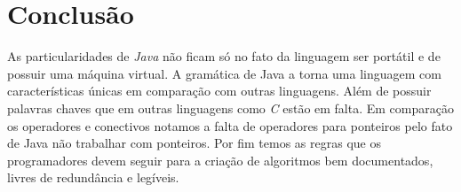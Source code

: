 \documentclass[conference]{IEEEtran}
\begin{document}
\begin{comment}
4.	Nomeação
a.	Use nomes significantes para variáveis, métodos e classes
b.	Para variáveis, métodos e pacotes devem ser usados palavras com caixa baixa. Nomes de classes devem conter palavras com a primeira letra maiúscula. Se um nome contém mais que duas palavras, é ideal deixar as palavras extras com letra maíscula.
c.	Use “final static” para declarar constantes nomeadas para representar dados constantes. Constantes geralmente tem nomes que estão de forma integral em caixa alta e com as palavras separadas com o traço inferior.
5.	Métodos
a.	Métodos devem conter uma clara e única tarefa identificável.
b.	Uma definição de método individual não deve ser muito longa. Em geral uma função não deve ser maior que uma página impressa.
c.	Os métodos de instância podem acessar as variáveis de instâncias que representam o estado de um objeto, mas deve-se evitar usar variáveis de instâncias para passar informações de um método a outro, para tanto, deve-se usar parâmetros de variáveis de retorno.
6.	Classe
a.	Uma classe deve representar um claro, único e identificável conceito
b.	Deve-se usar os modificadores, public, protected e private para controlar o acesso as variáveis
c.	Variáveis membros devem em geral, serem declaradas em privado. Métodos getters and setters podem ser providos para acessar e manipular as variáveis membros privadas.


\end{comment}


\begin{comment}
As particularidades de Java não ficam só no fato da linguagem ser portátil e de possuir uma máquina virtual. A gramática de Java a torna uma linguagem com características únicas em comparação com outras linguagens. Além de possuir palavras chaves que em outras linguagens como C estão em falta. Em comparação os operadores e conectivos notamos a falta de operadores para ponteiros pelo fato de Java não trabalhar com ponteiros. Por fim temos as regras que os programadores devem seguir para a criação de algoritmos bem documentados, livres de redundância e legíveis.

\end{comment}

\section*{Conclusão}

As particularidades de \textit{Java} não ficam só no fato da linguagem ser portátil e de possuir uma máquina virtual. A gramática de Java a torna uma linguagem com características únicas em comparação com outras linguagens. Além de possuir palavras chaves que em outras linguagens como \textit{C} estão em falta. Em comparação os operadores e conectivos notamos a falta de operadores para ponteiros pelo fato de Java não trabalhar com ponteiros. Por fim temos as regras que os programadores devem seguir para a criação de algoritmos bem documentados, livres de redundância e legíveis.
\end{document}
